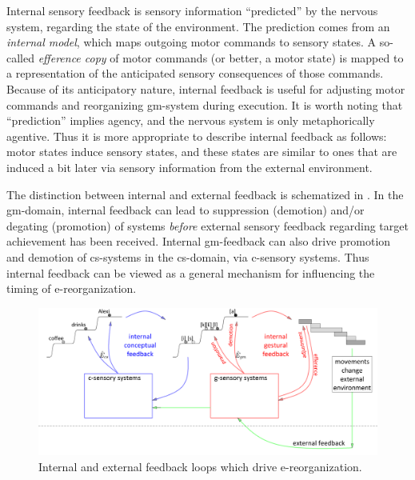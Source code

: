   Internal sensory feedback is sensory information “predicted” by the nervous system, regarding the state of the environment. The prediction comes from an \textit{internal model}, which maps outgoing motor commands to sensory states. A so-called \textit{efference copy} of motor commands (or better, a motor state) is mapped to a representation of the anticipated sensory consequences of those commands. Because of its anticipatory nature, internal feedback is useful for adjusting motor commands and reorganizing gm-system during execution. It is worth noting that “prediction” implies agency, and the nervous system is only metaphorically agentive. Thus it is more appropriate to describe internal feedback as follows: motor states induce sensory states, and these states are similar to ones that are induced a bit later via sensory information from the external environment.

The distinction between internal and external feedback is schematized in {}. In the gm-domain, internal feedback can lead to suppression (demotion) and/or degating (promotion) of systems \textit{before} external sensory feedback regarding target achievement has been received. Internal gm-feedback can also drive promotion and demotion of cs-systems in the cs-domain, via c-sensory systems. Thus internal feedback can be viewed as a general mechanism for influencing the timing of e-reorganization.

  
\begin{figure}
\includegraphics[width=\textwidth]{figures/Tilsen-img57.png}
\caption{Internal and external feedback loops which drive e-reorganization.}
\label{fig:4:7}
\end{figure}
       

